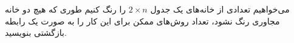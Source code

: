 \EXERCISE
می‌خواهیم تعدادی از خانه‌های یک جدول
$2 \times n$
را رنگ کنیم طوری که هیچ دو خانه مجاوری رنگ نشود، تعداد روش‌های ممکن برای این کار را به صورت یک رابطه بازگشتی بنویسید.